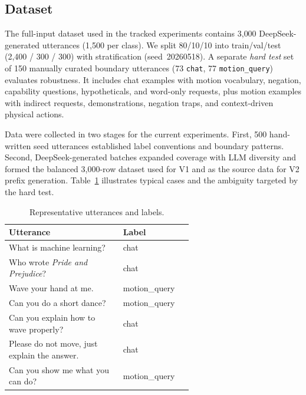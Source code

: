 \documentclass{article}
\begin{document}
\subsection{Dataset}
The full-input dataset used in the tracked experiments contains 3{,}000
DeepSeek-generated utterances (1{,}500 per class).
We split 80/10/10 into train/val/test (2{,}400 / 300 / 300) with
stratification (seed~20260518).
A separate \emph{hard test} set of 150 manually curated boundary utterances
(73 \texttt{chat}, 77 \texttt{motion\_query}) evaluates robustness. It includes
chat examples with motion vocabulary, negation, capability questions,
hypotheticals, and word-only requests, plus motion examples with indirect
requests, demonstrations, negation traps, and context-driven physical actions.

Data were collected in two stages for the current experiments.
First, 500 hand-written seed utterances established label conventions and
boundary patterns.
Second, DeepSeek-generated batches expanded coverage with LLM diversity and
formed the balanced 3{,}000-row dataset used for V1 and as the source data for
V2 prefix generation.
Table~\ref{tab:examples} illustrates typical cases and the ambiguity targeted
by the hard test.

\begin{table}[h]
  \centering
  \caption{Representative utterances and labels.}
  \label{tab:examples}
  \small
  \begin{tabular}{p{0.62\linewidth}l}
    \toprule
    Utterance & Label \\
    \midrule
    What is machine learning? & chat \\
    Who wrote \emph{Pride and Prejudice}? & chat \\
    Wave your hand at me. & motion\_query \\
    Can you do a short dance? & motion\_query \\
    Can you explain how to wave properly? & chat \\
    Please do not move, just explain the answer. & chat \\
    Can you show me what you can do? & motion\_query \\
    \bottomrule
  \end{tabular}
\end{table}
\end{document}
